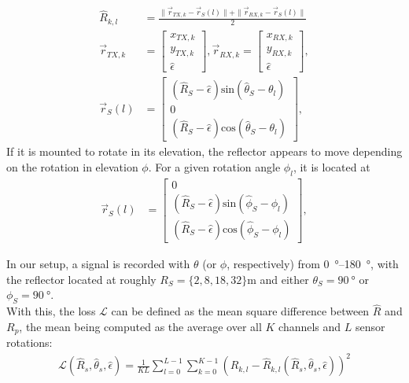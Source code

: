 \begin{align}
    \hat R_{k,l}   & = \frac{\| \vec r_{TX,k} - \vec r_S(l) \|+\| \vec r_{RX,k} - \vec r_S(l) \|}{2}
    \\
    \vec{r}_{TX,k} & = \begin{bmatrix}
                           x_{TX,k} \\ y_{TX,k} \\ \hat \epsilon
                       \end{bmatrix},
    \vec r_{RX,k}       = \begin{bmatrix}
                              x_{RX,k} \\ y_{RX,k} \\ \hat \epsilon
                          \end{bmatrix},                                                                                        \\
    \vec r_S(l)    & = \begin{bmatrix}
                           (\hat R_S-\hat \epsilon) \text{sin}(\hat \theta_S-\theta_l) \\ 0 \\ (\hat R_S-\hat \epsilon) \text{cos}(\hat \theta_S-\theta_l)
                       \end{bmatrix},
\end{align}
If it is mounted to rotate in its elevation, the reflector appears to move depending on the rotation in elevation $\phi$.
For a given rotation angle $\phi_l$, it is located at
\begin{align}
    \vec r_S(l) & = \begin{bmatrix}
                        0 \\ (\hat R_S-\hat \epsilon) \text{sin}(\hat \phi_S-\phi_l) \\ (\hat R_S-\hat \epsilon) \text{cos}(\hat \phi_S-\phi_l)
                    \end{bmatrix},
\end{align}

In our setup, a signal is recorded with $\theta$ (or $\phi$, respectively) from \SIrange{0}{180}{\degree},
with the reflector located at roughly $R_S = \{2,8,18,32\}\si{\meter}$ and either $\theta_S = \SI{90}{\degree}$ or $\phi_S = \SI{90}{\degree}$. \\


With this, the loss $\mathcal L$ can be defined as the mean square difference between $\hat R$ and $R_{p}$,
the mean being computed as the average over all $K$ channels and $L$ sensor rotations:
\begin{align}
    \mathcal L(\hat R_s, \hat \theta_s, \hat \epsilon)
    = \frac{1}{KL}\sum_{l=0}^{L-1} \sum_{k=0}^{K-1} ( R_{k,l} - \hat  R_{k,l}(\hat R_s, \hat \theta_s, \hat \epsilon))^2
\end{align} \\

